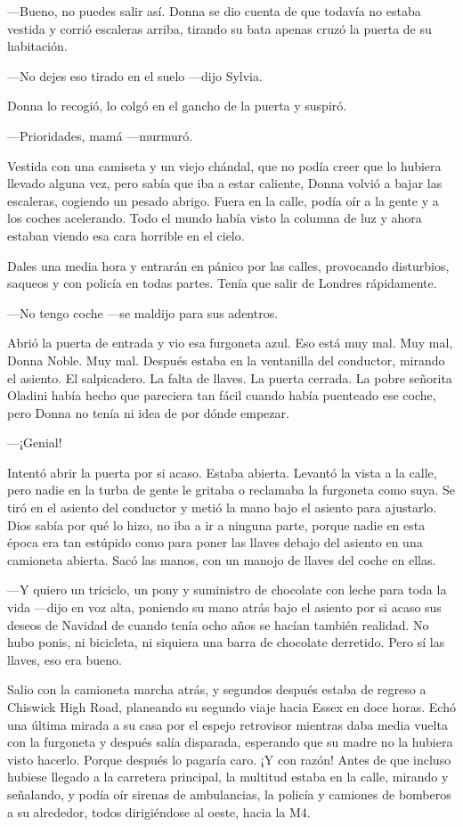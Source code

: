 ---Bueno, no puedes salir así. Donna se dio cuenta de que todavía no
estaba vestida y corrió escaleras arriba, tirando su bata apenas cruzó
la puerta de su habitación.

---No dejes eso tirado en el suelo ---dijo Sylvia.

Donna lo recogió, lo colgó en el gancho de la puerta y suspiró.

---Prioridades, mamá ---murmuró.

Vestida con una camiseta y un viejo chándal, que no podía creer que lo
hubiera llevado alguna vez, pero sabía que iba a estar caliente, Donna
volvió a bajar las escaleras, cogiendo un pesado abrigo. Fuera en la
calle, podía oír a la gente y a los coches acelerando. Todo el mundo
había visto la columna de luz y ahora estaban viendo esa cara horrible
en el cielo.

Dales una media hora y entrarán en pánico por las calles, provocando
disturbios, saqueos y con policía en todas partes. Tenía que salir de
Londres rápidamente.

---No tengo coche ---se maldijo para sus adentros.

Abrió la puerta de entrada y vio esa furgoneta azul. Eso está muy mal.
Muy mal, Donna Noble. Muy mal. Después estaba en la ventanilla del
conductor, mirando el asiento. El salpicadero. La falta de llaves. La
puerta cerrada. La pobre señorita Oladini había hecho que pareciera tan
fácil cuando había puenteado ese coche, pero Donna no tenía ni idea de
por dónde empezar.

---¡Genial!

Intentó abrir la puerta por si acaso. Estaba abierta. Levantó la vista a
la calle, pero nadie en la turba de gente le gritaba o reclamaba la
furgoneta como suya. Se tiró en el asiento del conductor y metió la mano
bajo el asiento para ajustarlo. Dios sabía por qué lo hizo, no iba a ir
a ninguna parte, porque nadie en esta época era tan estúpido como para
poner las llaves debajo del asiento en una camioneta abierta. Sacó las
manos, con un manojo de llaves del coche en ellas.

---Y quiero un triciclo, un pony y suministro de chocolate con leche
para toda la vida ---dijo en voz alta, poniendo su mano atrás bajo el
asiento por si acaso sus deseos de Navidad de cuando tenía ocho años se
hacían también realidad. No hubo ponis, ni bicicleta, ni siquiera una
barra de chocolate derretido. Pero sí las llaves, eso era bueno.

Salio con la camioneta marcha atrás, y segundos después estaba de
regreso a Chiswick High Road, planeando su segundo viaje hacia Essex en
doce horas. Echó una última mirada a su casa por el espejo retrovisor
mientras daba media vuelta con la furgoneta y después salía disparada,
esperando que su madre no la hubiera visto hacerlo. Porque después lo
pagaría caro. ¡Y con razón! Antes de que incluso hubiese llegado a la
carretera principal, la multitud estaba en la calle, mirando y
señalando, y podía oír sirenas de ambulancias, la policía y camiones de
bomberos a su alrededor, todos dirigiéndose al oeste, hacia la M4.

